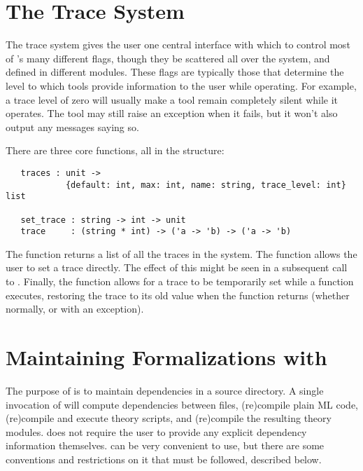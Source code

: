 \section{The Trace System}
\label{sec:traces}

The trace system gives the user one central interface with which to control most of \HOL's many different flags, though they be scattered all over the system, and defined in different modules.
These flags are typically those that determine the level to which \HOL{} tools provide information to the user while operating.
For example, a trace level of zero will usually make a tool remain completely
silent while it operates.
The tool may still raise an exception when it fails, but it won't also
output any messages saying so.

There are three core functions, all in the  structure:
\begin{hol}
\begin{verbatim}
   traces : unit ->
            {default: int, max: int, name: string, trace_level: int} list

   set_trace : string -> int -> unit
   trace     : (string * int) -> ('a -> 'b) -> ('a -> 'b)
\end{verbatim}
\end{hol}

The  function returns a list of all the traces in the system.
The  function allows the user to set a trace directly.
The effect of this might be seen in a subsequent call to .
Finally, the  function allows for a trace to be temporarily set while a function executes, restoring the trace to its old value when the function returns (whether normally, or with an exception).



\section{Maintaining \HOL{} Formalizations with \holmake}
\label{Holmake}

The purpose of \holmake{} is to maintain dependencies in a \HOL{}
source directory. A single invocation of \holmake{} will compute
dependencies between files, (re)compile plain ML code, (re)compile and
execute theory scripts, and (re)compile the resulting theory modules.
\holmake{} does not require the user to provide any explicit
dependency information themselves. \holmake{} can be very convenient
to use, but there are some conventions and restrictions on it that
must be followed, described below.




